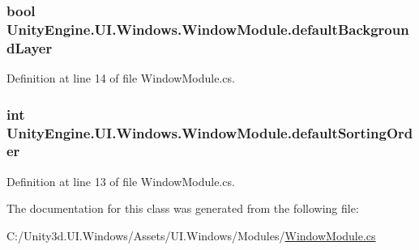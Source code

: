\subsubsection[{default\+Background\+Layer}]{\setlength{\rightskip}{0pt plus 5cm}bool Unity\+Engine.\+U\+I.\+Windows.\+Window\+Module.\+default\+Background\+Layer}\label{class_unity_engine_1_1_u_i_1_1_windows_1_1_window_module_a5692a649044632ac1e828a13c769ea60}


Definition at line 14 of file Window\+Module.\+cs.

\hypertarget{class_unity_engine_1_1_u_i_1_1_windows_1_1_window_module_a2192064ee05783863b735184ad55cf58}{}
\subsubsection[{default\+Sorting\+Order}]{\setlength{\rightskip}{0pt plus 5cm}int Unity\+Engine.\+U\+I.\+Windows.\+Window\+Module.\+default\+Sorting\+Order}\label{class_unity_engine_1_1_u_i_1_1_windows_1_1_window_module_a2192064ee05783863b735184ad55cf58}


Definition at line 13 of file Window\+Module.\+cs.



The documentation for this class was generated from the following file\+:\begin{DoxyCompactItemize}
\item 
C\+:/\+Unity3d.\+U\+I.\+Windows/\+Assets/\+U\+I.\+Windows/\+Modules/\hyperlink{_window_module_8cs}{Window\+Module.\+cs}\end{DoxyCompactItemize}
